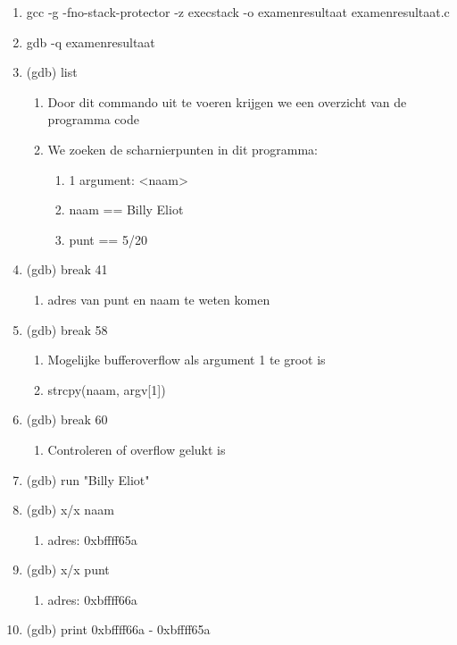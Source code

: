 \begin{enumerate}
  \item gcc -g -fno-stack-protector -z execstack -o examenresultaat examenresultaat.c
  \item gdb -q examenresultaat
  \item (gdb) list
  	\begin{enumerate}
  	\item Door dit commando uit te voeren krijgen we een overzicht van de programma code
  	\item We zoeken de scharnierpunten in dit programma:
  		\begin{enumerate}
  		\item 1 argument: \textless naam\textgreater
  		\item naam == Billy Eliot
  		\item punt == 5/20
  		\end{enumerate}
  	\end{enumerate}
  \item (gdb) break 41
  	\begin{enumerate}
  	\item adres van punt en naam te weten komen
  	\end{enumerate}
  \item (gdb) break 58
  	\begin{enumerate}
  	\item Mogelijke bufferoverflow als argument 1 te groot is
  	\item strcpy(naam, argv[1])
  	\end{enumerate}
  \item (gdb) break 60
  	\begin{enumerate}
  	\item Controleren of overflow gelukt is
  	\end{enumerate}
  \item (gdb) run "Billy Eliot"
  \item (gdb) x/x naam
  	\begin{enumerate}
  	\item adres: 0xbffff65a
  	\end{enumerate}
  \item (gdb) x/x punt
  	\begin{enumerate}
  	\item adres: 0xbffff66a
  	\end{enumerate}
  \item (gdb) print 0xbffff66a - 0xbffff65a
  	\begin{enumerate}

\end{enumerate}
\end{enumerate}
